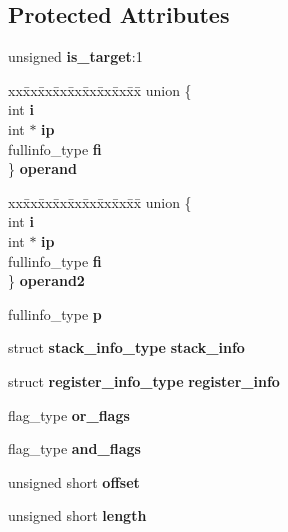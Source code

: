 \subsection*{Protected Attributes}
\begin{DoxyCompactItemize}
\item 
unsigned {\bfseries is\_\-target}:1\label{structinstruction__data__type_a869115f2f5ba394304d7bdacea6993ac}

\item 
\begin{tabbing}
xx\=xx\=xx\=xx\=xx\=xx\=xx\=xx\=xx\=\kill
union \{\\
\>int {\bfseries i}\\
\>int $\ast$ {\bfseries ip}\\
\>fullinfo\_type {\bfseries fi}\\
\} {\bfseries operand}\label{structinstruction__data__type_a5cfeca706c914113cba2835ebc035f02}
\\

\end{tabbing}\item 
\begin{tabbing}
xx\=xx\=xx\=xx\=xx\=xx\=xx\=xx\=xx\=\kill
union \{\\
\>int {\bfseries i}\\
\>int $\ast$ {\bfseries ip}\\
\>fullinfo\_type {\bfseries fi}\\
\} {\bfseries operand2}\label{structinstruction__data__type_a3538569218e08620a9b339e54b8873e0}
\\

\end{tabbing}\item 
fullinfo\_\-type {\bfseries p}\label{structinstruction__data__type_a30d6434e2219e7db70c1c82917dcf1e5}

\item 
struct {\bf stack\_\-info\_\-type} {\bfseries stack\_\-info}\label{structinstruction__data__type_a49bc9a3ab5e40023a088aa308be1d3ae}

\item 
struct {\bf register\_\-info\_\-type} {\bfseries register\_\-info}\label{structinstruction__data__type_a6d312c7c87bb8a368d6e7ab7969059fc}

\item 
flag\_\-type {\bfseries or\_\-flags}\label{structinstruction__data__type_a1cf5decac000591b705925d4583adbe7}

\item 
flag\_\-type {\bfseries and\_\-flags}\label{structinstruction__data__type_aff59d70f0d5843dea51db6b131a1e19c}

\item 
unsigned short {\bfseries offset}\label{structinstruction__data__type_ae6e0bc3d5e0e5e72da3d0aef1f9fbfa3}

\item 
unsigned short {\bfseries length}\label{structinstruction__data__type_a33217ea4a74126f2b34b7b8ae6bbc9a8}

\end{DoxyCompactItemize}


